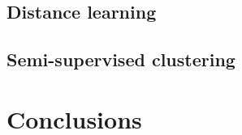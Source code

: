 \documentclass{article}
\begin{document}
\subsection{Distance learning}

\subsection{Semi-supervised clustering}



\section{Conclusions}
\label{conclusions}






\end{document}
